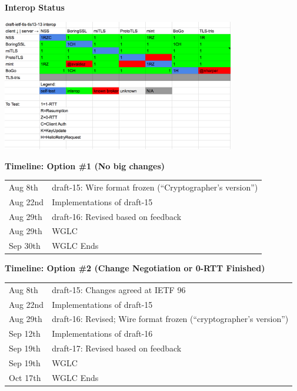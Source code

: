 \documentclass[helvetica]{seminar}
\newcommand{\heading}[1]{%
  \begin{center} 
    \large\bf 
    #1 
  \end{center} 
  \vspace{.4 in}}
\begin{document}
\begin{slide}
\heading{Interop Status}

\includegraphics[width=4in]{interop-matrix}

\end{slide}


\begin{slide}
\heading{Timeline: Option \#1 (No big changes)}

\begin{tabular}{l l}
Aug 8th & draft-15: Wire format frozen (``Cryptographer's version'') \\
Aug 22nd & Implementations of draft-15 \\
Aug 29th & draft-16: Revised based on feedback \\
Aug 29th & WGLC \\
Sep 30th & WGLC Ends \\
\end{tabular}

\end{slide}


\begin{slide}
\heading{Timeline: Option \#2 (Change Negotiation or 0-RTT Finished)}

\begin{tabular}{l l}
Aug 8th & draft-15: Changes agreed at IETF 96 \\
Aug 22nd & Implementations of draft-15 \\
Aug 29th & draft-16: Revised; Wire format frozen (``cryptographer's version'')\\
Sep 12th & Implementations of draft-16 \\
Sep 19th & draft-17: Revised based on feedback \\
Sep 19th & WGLC \\
Oct 17th & WGLC Ends \\
\end{tabular}

\end{slide}
\end{document}
